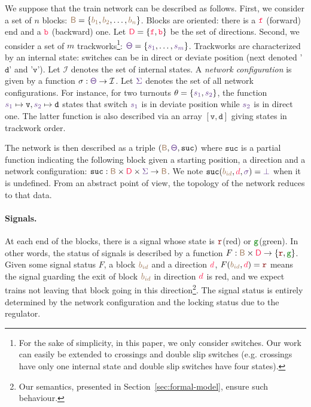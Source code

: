 \documentclass[runningheads]{llncs}
\newcommand{\directions}{\dirFmt{\mathsf{D}}}
\newcommand{\internalState}{{\mathcal{I}}}
\newcommand{\forward}{\ensuremath{\mathtt{f}}}
\newcommand{\backward}{\ensuremath{\mathtt{b}}\xspace}
\newcommand{\sucblock}{{\mathtt{suc}}}
\newcommand{\dirFmt}[1]{{\color{dircolor} #1}}
\newcommand{\dirForward}{\ensuremath{\dirFmt{\forward}}\xspace}
\newcommand{\dirBackward}{\ensuremath{\dirFmt{\backward}}\xspace}
\newcommand{\posFmt}[1]{{\color{poscolor}{#1}}}
\newcommand{\blocks}{{\posFmt{\mathsf{B}}}}
\newcommand{\bid}[1]{\ensuremath{\posFmt{b_{#1}}}}
\newcommand{\suc}[3]{\ensuremath{\sucblock(\posFmt{#1}, \dirFmt{#2}, \swFmt{#3})}}
\newcommand{\swFmt}[1]{{\color{swcolor}{#1}}}
\newcommand{\sid}[1]{\ensuremath{\swFmt{s_{#1}}}}
\newcommand{\turnouts}{\swFmt{\mathsf{\Theta}}}
\newcommand{\switches}{\ensuremath{\swFmt{\sigma}}}
\newcommand{\networkConf}{\ensuremath{\swFmt{\Sigma}}}
\newcommand{\nosuc}{\ensuremath{\swFmt{\bot}}}
\newcommand{\sigred}{{\mbox{${\color{red!50!black}\mathtt{r}}$}}\xspace}
\newcommand{\siggreen}{{\mbox{${\color{green!50!black}\mathtt{g}}$}}\xspace}
\newcommand{\deviate}{{\mbox{$\mathtt{v}$}}\xspace}
\newcommand{\direct}{{\mbox{$\mathtt{d}$}}\xspace}
\newcommand{\signalF}[2]{\ensuremath{\signals(\posFmt{#1}, \dirFmt{#2})}}
\newcommand{\signals}{\ensuremath{F}}
\begin{document}
We suppose that the train network can be described as follows. First, we consider a set of $n$ blocks: $\blocks = \{ \bid{1}, \bid{2}, \ldots, \bid{n}\}$. Blocks are oriented: there is a $\dirForward$ (forward) end and a $\dirBackward$ (backward) one. Let $\directions = \{\dirForward, \dirBackward\}$ be the set of directions.  Second, we consider a set of $m$ trackworks\footnote{For the sake of simplicity, in this paper, we only consider switches. Our work can easily be extended to crossings and double slip switches (e.g. crossings have only one internal state and double slip switches have four states).}: $\turnouts = \{\sid{1}, \ldots, \sid{m}\}$. Trackworks are characterized by an internal state: switches can be in direct or deviate position (next denoted '\direct' and '\deviate'). Let $\internalState$ denotes the set of internal states. A \emph{network configuration} is given by a function $\sigma: \turnouts \to \internalState$. Let $\networkConf$ denotes the set of all network configurations. For instance, for two turnouts $\theta = \{\sid{1}, \sid{2}\}$, the function $\sid{1} \mapsto \deviate, \sid{2} \mapsto \direct$ states that switch $\sid{1}$ is in deviate position while \sid{2} is in direct one. The latter function is also described via an array  $[\deviate, \direct]$ giving states in trackwork order. 

The network is then described as a triple $(\blocks, \turnouts, \sucblock)$ where $\sucblock$ is a partial function indicating the following block given a starting position, a direction and a network configuration: $\sucblock: \blocks\times \directions \times \networkConf \to \blocks$. We note $\suc{\bid{id}}{d}{\switches} = \nosuc$ when it is undefined. From an abstract point of view, the topology of the network reduces to that data.  


\paragraph{Signals.}
At each end of the blocks, there is a signal whose state is \sigred (red) or \siggreen (green). In other words, the status of signals is described by a function $F: \blocks \times \directions \to \{ \sigred, \siggreen\}$. Given some signal status $F$, a block $\bid{id}$ and a direction $\dirFmt{d}$, $\signalF{\bid{id}}{d} = \sigred$ means the signal guarding the exit of block $\bid{id}$ in direction $\dirFmt{d}$ is red, and we expect trains not leaving that block going in this direction\footnote{Our semantics, presented in Section~\ref{sec:formal-model}, ensure such behaviour.}. The signal status is entirely determined by the network configuration and the locking status due to the regulator.
\end{document}
